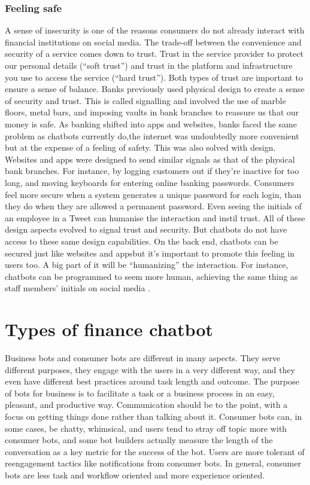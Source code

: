 \subsubsection{Feeling safe}
A sense of insecurity is one of the reasons consumers do not already interact with financial institutions on social media\cite{letheren2017}. The trade-off between the convenience and security of a service comes down to trust. Trust in the service provider to protect our personal details (“soft trust”) and trust in the platform and infrastructure you use to access the service (“hard trust”). Both types of trust are important to ensure a sense of balance. Banks previously used physical design to create a sense of security and trust. This is called signalling and involved the use of marble floors, metal bars, and imposing vaults in bank branches to reassure us that our money is safe. As banking shifted into apps and websites, banks faced the same problem as chatbots currently do,the internet was undoubtedly more convenient but at the expense of a feeling of safety. This was also solved with design. Websites and apps were designed to send similar signals as that of the physical bank branches. For instance, by logging customers out if they’re inactive for too long, and moving keyboards for entering online banking passwords. Consumers feel more secure when a system generates a unique password for each login, than they do when they are allowed a permanent password. Even seeing the initials of an employee in a Tweet can humanise the interaction and instil trust. All of these design aspects evolved to signal trust and security. But chatbots do not have access to these same design capabilities. On the back end, chatbots can be secured just like websites and appsbut it’s important to promote this feeling in users too. A big part of it will be “humanizing” the interaction. For instance, chatbots can be programmed to seem more human, achieving the same thing as staff members’ initials on social media \cite{letheren2017}.


\section{Types of finance chatbot}

Business bots and consumer bots are different in many aspects. They serve different purposes, they engage with the users in a very different way, and they even have different best practices around task length and outcome.
The purpose of bots for business is to facilitate a task or a business process in an easy, pleasant, and productive way. Communication should be to the point, with a focus on getting things done rather than talking about it. Consumer bots can, in some cases, be chatty, whimsical, and users tend to stray off topic more with consumer bots, and some bot builders actually measure the length of the conversation as a key metric for the success of the bot. Users are more tolerant of reengagement tactics like notifications from consumer bots. In general, consumer bots are less task and workflow oriented and more experience oriented. \cite{shevat2017}


